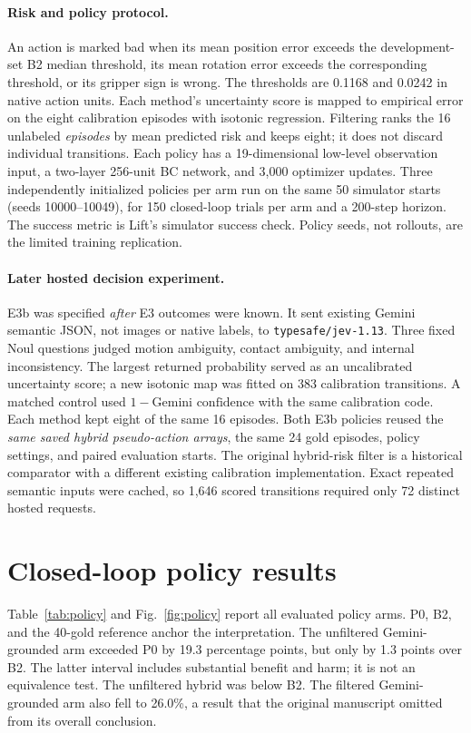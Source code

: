 \documentclass[11pt]{article}
\begin{document}
\paragraph{Risk and policy protocol.} An action is marked bad when its mean
position error exceeds the development-set B2 median threshold, its mean
rotation error exceeds the corresponding threshold, or its gripper sign is
wrong. The thresholds are 0.1168 and 0.0242 in native action units. Each
method's uncertainty score is mapped to empirical error on the eight
calibration episodes with isotonic regression. Filtering ranks the 16
unlabeled \emph{episodes} by mean predicted risk and keeps eight; it does not
discard individual transitions. Each policy has a 19-dimensional low-level
observation input, a two-layer 256-unit BC network, and 3,000 optimizer
updates. Three independently initialized policies per arm run on the same 50
simulator starts (seeds 10000--10049), for 150 closed-loop trials per arm and
a 200-step horizon. The success metric is Lift's simulator success check.
Policy seeds, not rollouts, are the limited training replication.

\paragraph{Later hosted decision experiment.} E3b was specified \emph{after}
E3 outcomes were known. It sent existing Gemini semantic JSON, not images or
native labels, to \texttt{typesafe/jev-1.13}. Three fixed Noul questions
judged motion ambiguity, contact ambiguity, and internal inconsistency.
The largest returned probability served as an uncalibrated uncertainty
score; a new isotonic map was fitted on 383 calibration transitions. A
matched control used $1-\text{Gemini confidence}$ with the same calibration
code. Each method kept eight of the same 16 episodes. Both E3b policies
reused the \emph{same saved hybrid pseudo-action arrays}, the same 24 gold
episodes, policy settings, and paired evaluation starts. The original
hybrid-risk filter is a historical comparator with a different existing
calibration implementation. Exact repeated semantic inputs were cached, so
1,646 scored transitions required only 72 distinct hosted requests.

\section{Closed-loop policy results}
Table~\ref{tab:policy} and Fig.~\ref{fig:policy} report all evaluated
policy arms. P0, B2, and the 40-gold reference anchor the interpretation.
The unfiltered Gemini-grounded arm exceeded P0 by 19.3 percentage points,
but only by 1.3 points over B2. The latter interval includes substantial
benefit and harm; it is not an equivalence test. The unfiltered hybrid was
below B2. The filtered Gemini-grounded arm also fell to 26.0\%, a result
that the original manuscript omitted from its overall conclusion.
\end{document}
